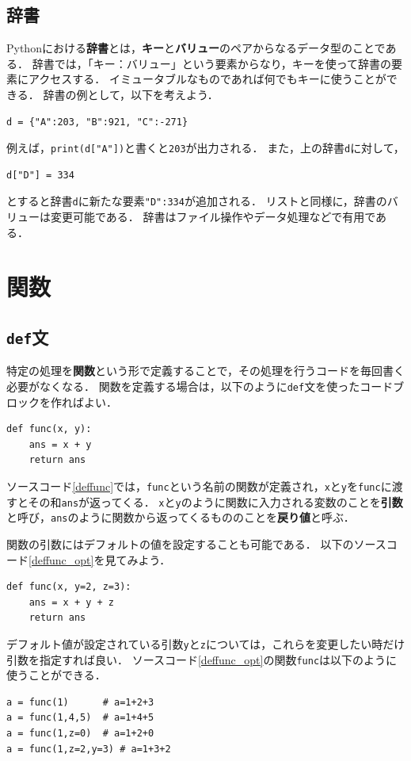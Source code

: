 \documentclass[a4paper,12pt]{jsarticle}
\begin{document}
\subsection{辞書}

Pythonにおける{\bf 辞書}とは，{\bf キー}と{\bf バリュー}のペアからなるデータ型のことである．
辞書では，「キー：バリュー」という要素からなり，キーを使って辞書の要素にアクセスする．
イミュータブルなものであれば何でもキーに使うことができる．
辞書の例として，以下を考えよう．
\begin{lstlisting}[caption=辞書の例,label=dictionary]
d = {"A":203, "B":921, "C":-271}
\end{lstlisting}
例えば，\texttt{print(d["A"])}と書くと\texttt{203}が出力される．
また，上の辞書\texttt{d}に対して，
\begin{lstlisting}[caption=辞書に要素を追加,label=dictionary_add]
d["D"] = 334
\end{lstlisting}
とすると辞書\texttt{d}に新たな要素\texttt{"D":334}が追加される．
リストと同様に，辞書のバリューは変更可能である．
辞書はファイル操作やデータ処理などで有用である．


\section{関数}

\subsection{\texttt{def}文}

特定の処理を{\bf 関数}という形で定義することで，その処理を行うコードを毎回書く必要がなくなる．
関数を定義する場合は，以下のように\texttt{def}文を使ったコードブロックを作ればよい．
\begin{lstlisting}[caption=関数を定義する,label=deffunc]
def func(x, y):
    ans = x + y
    return ans
\end{lstlisting}
ソースコード\ref{deffunc}では，\texttt{func}という名前の関数が定義され，\texttt{x}と\texttt{y}を\texttt{func}に渡すとその和\texttt{ans}が返ってくる．
\texttt{x}と\texttt{y}のように関数に入力される変数のことを{\bf 引数}と呼び，\texttt{ans}のように関数から返ってくるもののことを{\bf 戻り値}と呼ぶ．

関数の引数にはデフォルトの値を設定することも可能である．
以下のソースコード\ref{deffunc_opt}を見てみよう．
\begin{lstlisting}[caption=デフォルト値つきの関数を定義する,label=deffunc_opt]
def func(x, y=2, z=3):
    ans = x + y + z
    return ans
\end{lstlisting}
デフォルト値が設定されている引数\texttt{y}と\texttt{z}については，これらを変更したい時だけ引数を指定すれば良い．
ソースコード\ref{deffunc_opt}の関数\texttt{func}は以下のように使うことができる．
\begin{lstlisting}[caption=デフォルト値つきの関数の使い方,label=use_func_opt]
a = func(1)      # a=1+2+3
a = func(1,4,5)  # a=1+4+5
a = func(1,z=0)  # a=1+2+0
a = func(1,z=2,y=3) # a=1+3+2
\end{lstlisting}
\end{document}
